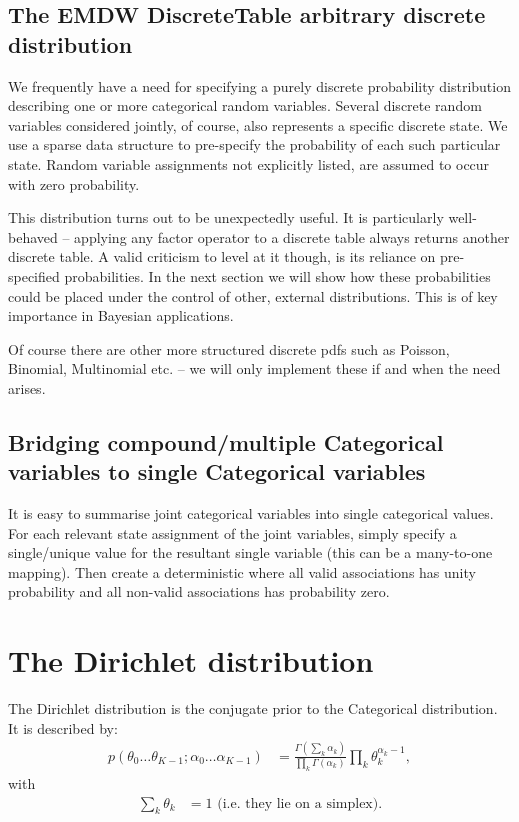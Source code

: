 \documentclass[oneside,english]{scrbook}
\begin{document}
\section{The EMDW DiscreteTable arbitrary discrete distribution}

We frequently have a need for specifying a purely discrete probability
distribution describing one or more categorical random
variables. Several discrete random variables considered jointly, of
course, also represents a specific discrete state. We use a sparse
data structure to pre-specify the probability of each such particular
state. Random variable assignments not explicitly listed, are assumed
to occur with zero probability.

This distribution turns out to be unexpectedly useful. It is
particularly well-behaved -- applying any factor operator to a
discrete table always returns another discrete table. A valid
criticism to level at it though, is its reliance on pre-specified
probabilities. In the next section we will show how these
probabilities could be placed under the control of other, external
distributions. This is of key importance in Bayesian applications.

Of course there are other more structured discrete pdfs such as
Poisson, Binomial, Multinomial etc. -- we will only implement these
if and when the need arises.


\section{Bridging compound/multiple Categorical variables to single Categorical variables \label{sec:multicat}}
It is easy to summarise joint categorical variables into single
categorical values. For each relevant state assignment of the joint
variables, simply specify a single/unique value for the resultant
single variable (this can be a many-to-one mapping). Then create a
deterministic \verb@DiscreteTable@ where all valid associations has
unity probability and all non-valid associations has probability zero.

\chapter{The Dirichlet distribution}

The Dirichlet distribution is the conjugate prior to the Categorical
distribution. It is described by:
\begin{align}
  p(\theta_{0} \ldots \theta_{K-1} ; \alpha_{0} \ldots \alpha_{K-1})
  &= \frac{\Gamma(\sum_k \alpha_k)}{\prod_{k}\Gamma(\alpha_k)}
      \prod_{k}\theta_k^{\alpha_k-1}, \label{eq:dirichlet}
\end{align}
with
\begin{align*}
  \sum_{k}\theta_k &= 1 \mbox{ (i.e. they lie on a simplex).}
\end{align*}
\end{document}

